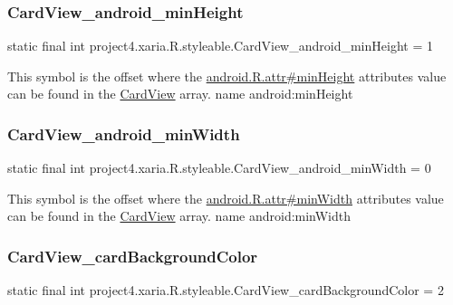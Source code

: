 \subsubsection{\texorpdfstring{Card\+View\+\_\+android\+\_\+min\+Height}{CardView\_android\_minHeight}}
{\footnotesize\ttfamily static final int project4.\+xaria.\+R.\+styleable.\+Card\+View\+\_\+android\+\_\+min\+Height = 1\hspace{0.3cm}{\ttfamily [static]}}

This symbol is the offset where the \hyperlink{}{android.\+R.\+attr\#min\+Height} attribute\textquotesingle{}s value can be found in the \hyperlink{classproject4_1_1xaria_1_1R_1_1styleable_abef2e3d3e2b11dd786470094dbc57ea4}{Card\+View} array.  name android\+:min\+Height \mbox{\label{classproject4_1_1xaria_1_1R_1_1styleable_a656ba8dea65186ef0004bd7170c8fa84}} 
\subsubsection{\texorpdfstring{Card\+View\+\_\+android\+\_\+min\+Width}{CardView\_android\_minWidth}}
{\footnotesize\ttfamily static final int project4.\+xaria.\+R.\+styleable.\+Card\+View\+\_\+android\+\_\+min\+Width = 0\hspace{0.3cm}{\ttfamily [static]}}

This symbol is the offset where the \hyperlink{}{android.\+R.\+attr\#min\+Width} attribute\textquotesingle{}s value can be found in the \hyperlink{classproject4_1_1xaria_1_1R_1_1styleable_abef2e3d3e2b11dd786470094dbc57ea4}{Card\+View} array.  name android\+:min\+Width \mbox{\label{classproject4_1_1xaria_1_1R_1_1styleable_ab56702194685aec3a36f901e12d1f432}} 
\subsubsection{\texorpdfstring{Card\+View\+\_\+card\+Background\+Color}{CardView\_cardBackgroundColor}}
{\footnotesize\ttfamily static final int project4.\+xaria.\+R.\+styleable.\+Card\+View\+\_\+card\+Background\+Color = 2\hspace{0.3cm}{\ttfamily [static]}}

